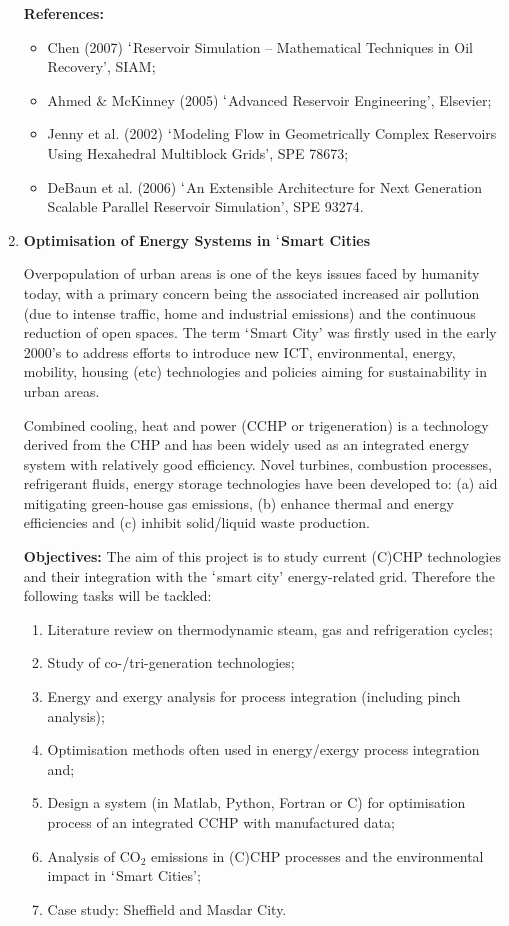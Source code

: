 \documentclass[12pts,a4paper,amsmath,amssymb,floatfix]{article}%
\begin{document}
\begin{enumerate}[label=\bfseries Project \arabic*:]
\noindent
{\bf References:}
\begin{itemize}
\item Chen (2007) $\lq$Reservoir Simulation – Mathematical Techniques in Oil Recovery’, SIAM;
\item Ahmed $\&$ McKinney (2005) $\lq$Advanced Reservoir Engineering’, Elsevier;
\item Jenny et al. (2002) $\lq$Modeling Flow in Geometrically Complex Reservoirs Using Hexahedral Multiblock Grids’, SPE 78673;
\item DeBaun et al. (2006) $\lq$An Extensible Architecture for Next Generation Scalable Parallel Reservoir Simulation’, SPE 93274.
\end{itemize}

\clearpage

\item {\bf Optimisation of Energy Systems in $\lq$Smart Cities}

Overpopulation of urban areas is one of the keys issues faced by humanity today, with a primary concern being the associated increased air pollution (due to intense traffic, home and industrial emissions) and the continuous reduction of open spaces. The term $\lq$Smart City’ was firstly used  in the early 2000’s to address efforts to introduce new ICT, environmental, energy, mobility, housing (etc) technologies and policies aiming for sustainability in urban areas.

Combined cooling, heat and power (CCHP or trigeneration) is a technology derived from the CHP and has been widely used as an integrated energy system with relatively good efficiency. Novel turbines, combustion processes, refrigerant fluids, energy storage technologies have been developed to: (a) aid mitigating green-house gas emissions, (b) enhance thermal and energy efficiencies and (c) inhibit solid/liquid waste production.

\noindent
{\bf Objectives:} The aim of this project is to study current (C)CHP technologies and their integration with the $\lq$smart city’ energy-related grid. Therefore the following tasks will be tackled:
\begin{enumerate}
\item Literature review on thermodynamic steam, gas and refrigeration cycles;
\item Study of co-/tri-generation technologies;
\item Energy and exergy analysis for process integration (including pinch analysis);
\item Optimisation methods often used in energy/exergy process integration and;
\item Design a system (in Matlab, Python, Fortran or C) for optimisation process of an integrated CCHP with manufactured data;
\item Analysis of CO$_{2}$ emissions in (C)CHP processes and the environmental impact in $\lq$Smart Cities';
\item Case study: Sheffield and Masdar City.
\end{enumerate}



\end{enumerate}
\end{document}
